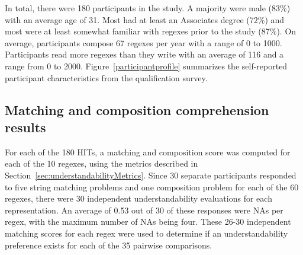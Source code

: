 In total, there were 180 participants in the study.
A majority were male (83\%) with an average age of 31. Most had
at least an Associates degree (72\%) and most were at least somewhat familiar with regexes prior to the study (87\%). On average,
participants compose 67 regexes per year with a range of 0 to 1000.
Participants read more regexes than they write with an average of 116 and a range from 0 to 2000.
Figure~\ref{participantprofile} summarizes the self-reported participant characteristics from the qualification survey.

\subsection{Matching and composition comprehension results}
\label{sec:comprehensionResults}

For each of the 180 HITs, a matching and composition score was computed for each of the 10 regexes, using the metrics described in Section~\ref{sec:understandabilityMetrics}.  Since 30 separate participants responded to five string matching problems and one composition problem for each of the 60 regexes, there were 30 independent understandability evaluations for each representation.  An average of 0.53 out of 30 of these responses were NAs per regex, with the maximum number of NAs being four.  These 26-30 independent matching scores for each regex were used to determine if an understandability preference exists for each of the 35 pairwise comparisons.

